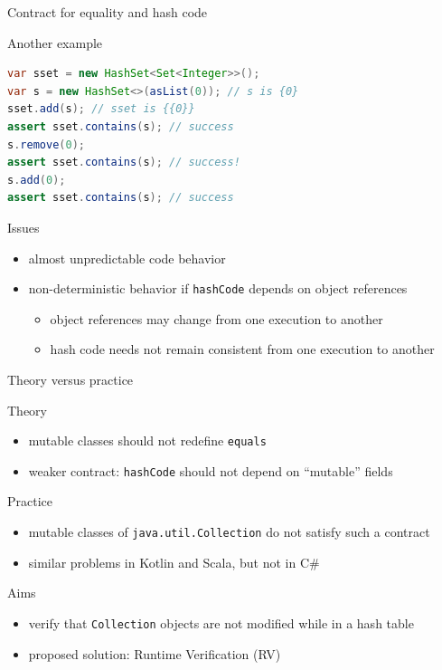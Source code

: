 \documentclass[10pt,usenames,dvipsnames]{beamer}
\begin{document}
\begin{frame}[fragile]{Contract for equality and hash code}
  \begin{block}{Another example}
    \begin{lstlisting}[language=Java]
var sset = new HashSet<Set<Integer>>();
var s = new HashSet<>(asList(0)); // s is {0}
sset.add(s); // sset is {{0}}
assert sset.contains(s); // success
s.remove(0);
assert sset.contains(s); // success!
s.add(0);
assert sset.contains(s); // success
    \end{lstlisting}
  \end{block}

  \begin{block}{Issues}
    \begin{itemize}
    \item almost unpredictable code behavior
    \item non-deterministic behavior if \lstinline{hashCode} depends on object references
      \begin{itemize}
      \item object references may change from one execution to another 
      \item hash code needs not remain consistent from one execution to another 
      \end{itemize}    
    \end{itemize}    
  \end{block}
\end{frame}


\begin{frame}[fragile]{Theory versus practice}
  \begin{block}{Theory}
    \begin{itemize}
    \item mutable classes should not redefine \lstinline{equals}
    \item weaker contract: \lstinline{hashCode} should not depend on ``mutable'' fields
    \end{itemize}   
  \end{block}

  \begin{block}{Practice}
    \begin{itemize}
    \item mutable classes of \lstinline{java.util.Collection} do not satisfy such a contract 
    \item similar problems in Kotlin and Scala, but not in C\#
    \end{itemize}   
  \end{block}


    \begin{block}{Aims}
    \begin{itemize}
    \item verify that \lstinline{Collection} objects are not modified while in a hash table
    \item proposed solution: Runtime Verification (RV)
    \end{itemize}   
  \end{block}

\end{frame}
\end{document}
